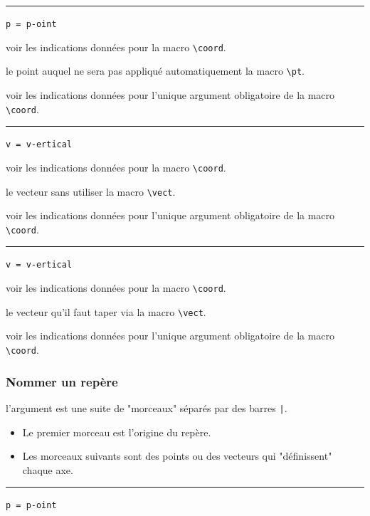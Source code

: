 \documentclass[12pt,a4paper]{book}
\newcommand\env[1]{\texttt{#1}}
\newcommand\macro[1]{\env{\textbackslash{}#1}}
\theoremstyle{definition}
\newcommand\separation{
	\medskip
	\hfill\rule{0.5\textwidth}{0.75pt}\hfill
	\medskip
}
\newcommand\mwhyprefix[2]{%
	\texttt{#1 = #1-#2}%
}
\begin{document}
{{\separation


 \hfill \mwhyprefix{p}{oint}

\IDoption{} voir les indications données pour la macro \macro{coord}.

 le point auquel ne sera pas appliqué automatiquement la macro \macro{pt}.

 voir les indications données pour l'unique argument obligatoire de la macro \macro{coord}.


\separation


 \hfill \mwhyprefix{v}{ertical}

\IDoption{} voir les indications données pour la macro \macro{coord}.

 le vecteur sans utiliser la macro \macro{vect}.

 voir les indications données pour l'unique argument obligatoire de la macro \macro{coord}.


\separation


 \hfill \mwhyprefix{v}{ertical}

\IDoption{} voir les indications données pour la macro \macro{coord}.

 le vecteur qu'il faut taper via la macro \macro{vect}.

 voir les indications données pour l'unique argument obligatoire de la macro \macro{coord}.


\subsubsection{Nommer un repère}





\IDarg{} l'argument est une suite de "morceaux" séparés par des barres \verb+|+.

\begin{itemize}[topsep=0pt]
	\item Le premier morceau est l'origine du repère.

	\item Les morceaux suivants sont des points ou des vecteurs qui "définissent" chaque axe.
\end{itemize}


\separation

 \hfill \mwhyprefix{p}{oint}

}}
\end{document}
